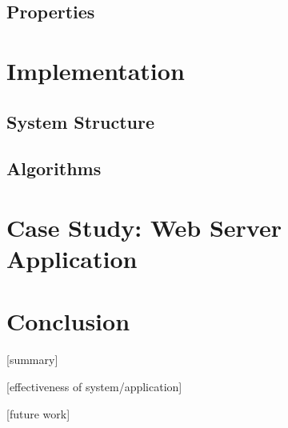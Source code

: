 \documentclass[10pt, twocolumn]{article}
\begin{document}
    \subsection{Properties}

  \section{Implementation}

    \subsection{System Structure}

    \subsection{Algorithms}

  \section{Case Study: Web Server Application}

  \section{Conclusion}

    [summary]

    [effectiveness of system/application]

    [future work]
\end{document}
